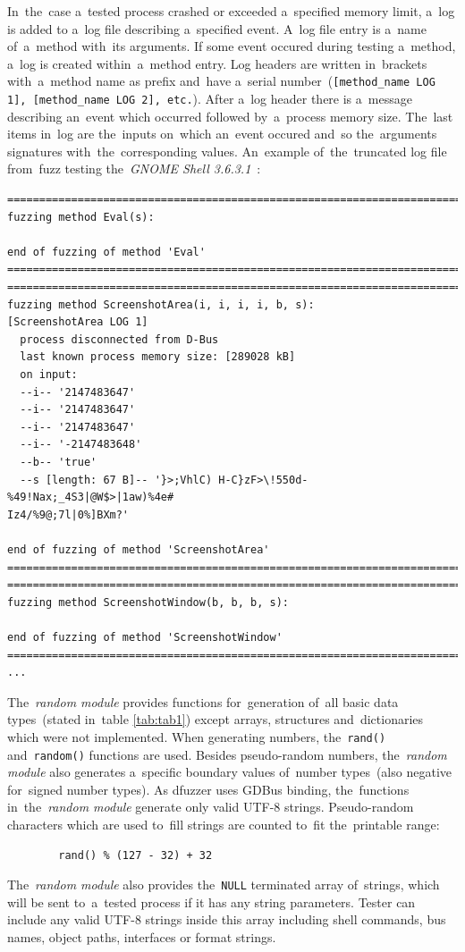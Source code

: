 In~the~case a~tested process crashed or exceeded a~specified memory limit,
a~log is added to a~log file describing a~specified event. A~log file entry
is a~name of~a~method with~its arguments. If some event occured during testing
a~method, a~log is created within~a~method entry. Log headers are written in~brackets
with~a~method name as prefix and~have a~serial number~(\texttt{[method\_name LOG 1],
[method\_name LOG 2], etc.}). After a~log header there is a~message describing
an~event which occurred followed by~a~process memory size. The~last items in~log
are the~inputs on~which an~event occured and~so the~arguments signatures
with~the~corresponding values. An~example of~the~truncated log file from~fuzz
testing the~\emph{GNOME Shell 3.6.3.1}~\cite{GNOMEShell}:
\newpage
\begin{lstlisting}[frame=single]
===========================================================================
fuzzing method Eval(s):

end of fuzzing of method 'Eval'
===========================================================================
===========================================================================
fuzzing method ScreenshotArea(i, i, i, i, b, s):
[ScreenshotArea LOG 1]
  process disconnected from D-Bus
  last known process memory size: [289028 kB]
  on input:
  --i-- '2147483647'
  --i-- '2147483647'
  --i-- '2147483647'
  --i-- '-2147483648'
  --b-- 'true'
  --s [length: 67 B]-- '}>;VhlC) H-C}zF>\!550d-%49!Nax;_4S3|@W$>|1aw)%4e#
Iz4/%9@;7l|0%]BXm?'

end of fuzzing of method 'ScreenshotArea'
===========================================================================
===========================================================================
fuzzing method ScreenshotWindow(b, b, b, s):

end of fuzzing of method 'ScreenshotWindow'
===========================================================================
...
\end{lstlisting}


The~\emph{random module} provides functions for~generation of~all basic data
types~(stated in~table \ref{tab:tab1}) except arrays, structures and~dictionaries
which were not implemented.
When generating numbers, the~\texttt{rand()} and~\texttt{random()} functions are
used. Besides pseudo-random numbers, the~\emph{random module} also generates
a~specific boundary values of~number types~(also negative for~signed number types).
As dfuzzer uses GDBus binding, the~functions in~the~\emph{random module} generate
only valid UTF-8 strings. Pseudo-random characters which are used to~fill strings
are counted to~fit the~printable range:
\begin{verbatim}
        rand() % (127 - 32) + 32
\end{verbatim}
The~\emph{random module} also provides the~\texttt{NULL} terminated array of~strings,
which will be sent to~a~tested process if it has any string parameters. Tester
can include any valid UTF-8 strings inside this array including shell commands,
bus names, object paths, interfaces or format strings.\\

